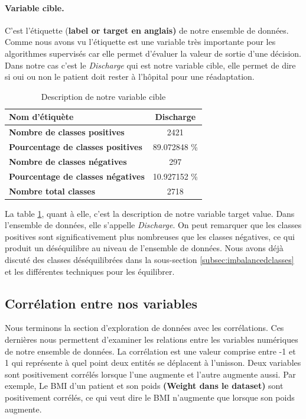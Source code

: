 \documentclass[12pt, french]{report}
\begin{document}
\paragraph*{ Variable cible.} C'est l'étiquette (\textbf{label or target en anglais)} de notre ensemble de données. Comme nous avons vu l'étiquette est une variable très importante pour les algorithmes supervisés car elle permet d'évaluer la valeur de sortie d'une décision. Dans notre cas c'est le \textit{Discharge} qui est notre variable cible, elle permet de dire si oui ou non le patient doit rester à l'hôpital pour une réadaptation. \\

\begin{table}[h]
\centering
\begin{tabular}{| l | c |}
\hline
\textbf{Nom d'étiquète} & Discharge \\
\hline
\textbf{Nombre de classes positives} & 2421 \\
\hline
\textbf{Pourcentage de classes positives} & 89.072848 \% \\
\hline
\textbf{Nombre de  classes négatives} & 297 \\
\hline
\textbf{Pourcentage de classes négatives} & 10.927152 \% \\
\hline
\textbf{Nombre total classes} & 2718 \\

\hline
\end{tabular}
\caption{Description de notre variable cible}
\label{tab:target}
\end{table}

La table \ref{tab:target}, quant à elle, c'est la description de notre variable target value. Dans l'ensemble de données, elle s'appelle \textit{Discharge}. On peut remarquer que les classes positives sont significativement plus nombreuses que les classes négatives, ce qui produit un déséquilibre au niveau de l'ensemble de données. Nous avons déjà discuté des classes déséquilibrées dans la sous-section \ref{subsec:imbalancedclasses} et les différentes techniques pour les équilibrer.

\subsection{Corrélation entre nos variables}
Nous terminons la section d'exploration de données avec les corrélations. Ces dernières nous permettent d'examiner les relations entre les variables numériques de notre ensemble de données. La corrélation est une valeur comprise entre -1 et 1 qui représente à quel point deux entités se déplacent à l'unisson. Deux variables sont positivement corrélés lorsque l'une augmente et l'autre augmente aussi. Par exemple, Le BMI d'un patient et son poids\textbf{ (Weight dans le dataset)} sont positivement corrélés, ce qui veut dire le BMI n'augmente que lorsque son poids augmente.\\
\end{document}

